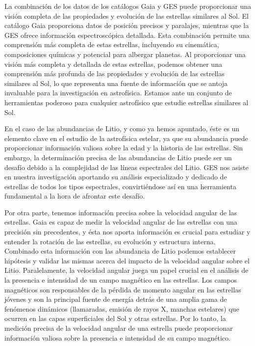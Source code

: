 La combinación de los datos de los catálogos Gaia y GES puede proporcionar una visión completa de las propiedades y evolución de las estrellas similares al Sol. El catálogo Gaia proporciona datos de posición precisos y paralajes, mientras que la GES ofrece información espectroscópica detallada. Esta combinación permite una comprensión más completa de estas estrellas, incluyendo su cinemática, composiciones químicas y potencial para albergar planetas. Al proporcionar una visión más completa y detallada de estas estrellas, podemos obtener una comprensión más profunda de las propiedades y evolución de las estrellas similares al Sol, lo que representa una fuente de información que se antoja invaluable para la investigación en astrofísica. Estamos ante un conjunto de herramientas poderoso para cualquier astrofísico que estudie estrellas similares al Sol.\par

En el caso de las abundancias de Litio, y como ya hemos apuntado, éste es un elemento clave en el estudio de la astrofísica estelar, ya que su abundancia puede proporcionar información valiosa sobre la edad y la historia de las estrellas. Sin embargo, la determinación precisa de las abundancias de Litio puede ser un desafío debido a la complejidad de las líneas espectrales del Litio. GES nos asiste en nuestra investigación aportando su análisis especializado y dedicado de estrellas de todos los tipos espectrales, convirtiéndose así en una herramienta fundamental a la hora de afrontar este desafío.\par

Por otra parte, tenemos información precisa sobre la velocidad angular de las estrellas. Gaia es capaz de medir la velocidad angular de las estrellas con una precisión sin precedentes, y ésta nos aporta información es crucial para estudiar y entender la rotación de las estrellas, su evolución y estructura interna. Combinado esta información con las abundancia de Litio podemos establecer hipótesis y validar las mismas acerca del impacto de la velocidad angular sobre el Litio. Paralelamente, la velocidad angular juega un papel crucial en el análisis de la presencia e intensidad de un campo magnético en las estrellas. Los campos magnéticos son responsables de la pérdida de momento angular en las estrellas jóvenes y son la principal fuente de energía detrás de una amplia gama de fenómenos dinámicos (llamaradas, emisión de rayos X, manchas estelares) que ocurren en las capas superficiales del Sol y otras estrellas. Por lo tanto, la medición precisa de la velocidad angular de una estrella puede proporcionar información valiosa sobre la presencia e intensidad de su campo magnético.\par

